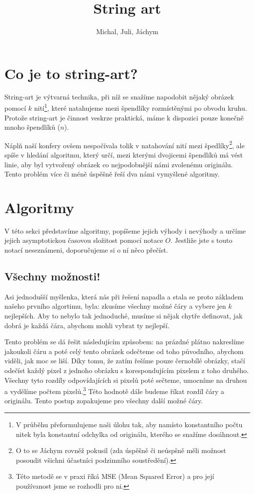 \documentclass{article}
\author{Michal, Juli, Jáchym}
\title{String art}
\begin{document}
\maketitle

\section{Co je to string-art?}
\label{sec:string-art}
String-art je výtvarná technika, při níž se snažíme napodobit nějaký obrázek pomocí $k$
nití\footnote{V průběhu přeformulujeme naši úlohu tak, aby namísto konstantního počtu nitek byla konstantní odchylka od originálu, kterého se snažíme dosáhnout.}, které natahujeme mezi špendlíky rozmístěnými po obvodu kruhu. Protože string-art je činnost veskrze praktická, máme k dispozici pouze konečně mnoho špendlíků ($n$).

Náplň naší konfery ovšem nespočívala tolik v natahování nití mezi špedlíky\footnote{O to se Jáchym rovněž pokusil (zda úspěšně či neúspšně měli možnost posoudit všichni účastníci podzimního soustředění).}, ale spíše v hledání algoritmu, který určí, mezi kterými dvojicemi špendlíků má vést linie, aby byl vytvořený obrázek co nejpodobnější námi zvolenému originálu. Tento problém více či méně úspěšně řeší dva námi vymyšlené algoritmy.


\section{Algoritmy}
\label{sec:algoritmy}
V této sekci představíme algoritmy, popíšeme jejich výhody i nevýhody a určíme jejich asymptotickou časovou složitost pomocí notace $O$. Jestliže jste s touto notací neseznámeni, doporučujeme si o ní něco přečíst.

\subsection{Všechny možnosti!}
\label{ssec:vsechny-moznosti}
Asi jednodušší myšlenka, která nás při řešení napadla a stala se proto základem našeho prvního algortimu, byla:
zkusíme všechny možné čáry a vybere jen $k$ nejlepších. 
Aby to nebylo tak jednoduché, musíme si nějak chytře definovat, jak dobrá je každá čára, abychom mohli vybrat ty nejlepší.

Tento problém se dá řešit následujícím způsobem: na prázdné plátno nakreslíme jakoukoli čáru a poté celý tento obrázek odečteme od toho původního, abychom viděli, jak moc se liší. Díky tomu, že zatím řešíme pouze černobílé obrázky, stačí odečíst každý pixel z jednoho obrázku s
korespondujícím pixelem z toho druhého. Všechny tyto rozdíly odpovídajících si pixelů poté sečteme, umocníme na druhou a vydělíme počtem pixelů.\footnote{Této metodě se v praxi říká MSE (Mean Squared Error) a pro její používanost jsme se rozhodli pro ni.} Této hodnotě
dále budeme říkat rozdíl čáry a originálu. Tento postup zopakujeme pro všechny další možné čáry.
\end{document}
